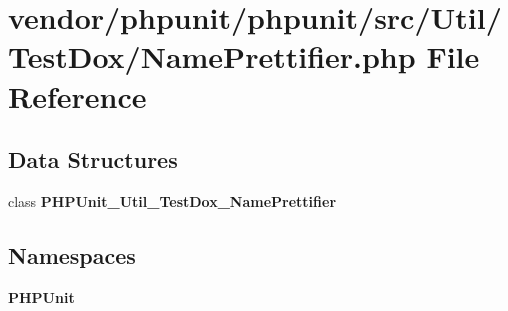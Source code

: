 \section{vendor/phpunit/phpunit/src/\+Util/\+Test\+Dox/\+Name\+Prettifier.php File Reference}
\label{_name_prettifier_8php}
\subsection*{Data Structures}
\begin{DoxyCompactItemize}
\item 
class {\bf P\+H\+P\+Unit\+\_\+\+Util\+\_\+\+Test\+Dox\+\_\+\+Name\+Prettifier}
\end{DoxyCompactItemize}
\subsection*{Namespaces}
\begin{DoxyCompactItemize}
\item 
 {\bf P\+H\+P\+Unit}
\end{DoxyCompactItemize}
